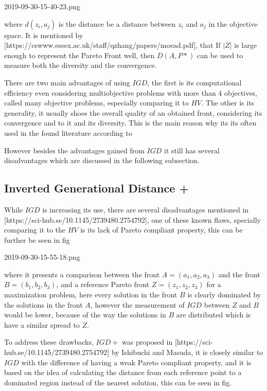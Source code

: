
2019-09-30-15-40-23.png

where $d(z_i,a_j)$ is the distance be a distance between $z_i$ and $a_j$ in the objective space. It is mentioned by [https://cswww.essex.ac.uk/staff/qzhang/papers/moead.pdf], that If $|Z|$ is large enough to represent the Pareto Front well, then $D(A,P*)$ can be used to measure both the diversity and the convergence.

There are two main advantages of using $IGD$, the first is its computational efficiency even considering multiobjective problems with more than 4 objectives, called many objective problems, especially comparing it to $HV$. The other is its generality, it usually shoes the overall quality of an obtained front, considering its convergence and to it and its diversity. This is the main reason why its its often used in the found literature according to 

However besides the advantages gained from $IGD$ it still has several disadvantages which are discussed in the following subsection.

\subsection{Inverted Generational Distance +}

While $IGD$ is increasing its use, there are several disadvantages mentioned in [https://sci-hub.se/10.1145/2739480.2754792], one of these known flaws, specially comparing it to the $HV$ is its lack of Pareto compliant property, this can be further be seen in fig


2019-09-30-15-55-18.png

where it presents a comparison between the front $A = (a_1, a_2, a_3)$ and the front $B = (b_1, b_2, b_3)$, and a reference Pareto front $Z = (z_1, z_2, z_3)$ for a maximization problem, here every solution in the front $B$ is clearly dominated by the solutions in the front $A$, however the measurement of $IGD$ between $Z$ and $B$ would be lower, because of the way the solutions in $B$ are distributed which is have a similar spread to $Z$.

To address these drawbacks, $IGD+$ was proposed in [https://sci-hub.se/10.1145/2739480.2754792] by Ishibuchi and Masuda, it is closely similar to $IGD$ with the difference of having a weak Pareto compliant property, and it is based on the idea of calculating the distance from each reference point to a dominated region instead of the nearest solution, this can be seen in fig.


